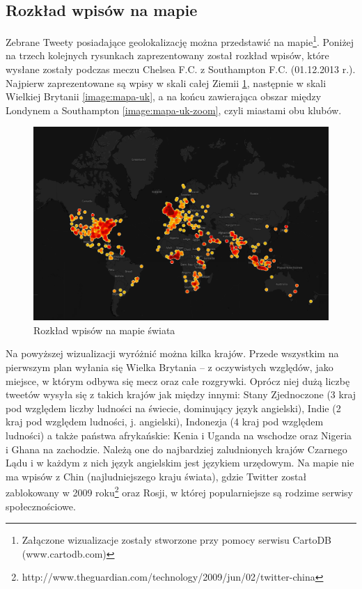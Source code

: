 

\clearpage
\subsection{Rozkład wpisów na mapie}
\label{subsection:rozkladnamapie}
Zebrane Tweety posiadające geolokalizację można przedstawić na
mapie\footnote{Załączone wizualizacje zostały stworzone przy pomocy serwisu
CartoDB (www.cartodb.com)}.
Poniżej na trzech kolejnych rysunkach zaprezentowany został rozkład wpisów,
które wysłane zostały podczas meczu Chelsea F.C. z Southampton F.C.
(01.12.2013 r.). Najpierw zaprezentowane są wpisy w skali całej Ziemii
\ref{image:mapa-swiata}, następnie w skali Wielkiej Brytanii
\ref{image:mapa-uk}, a na końcu zawierająca obszar między Londynem a Southampton
\ref{image:mapa-uk-zoom}, czyli miastami obu klubów.

\begin{figure}[ht!]
\centering
\includegraphics[width=140mm]{img/geo-chelsea-southampton.png}
\caption{Rozkład wpisów na mapie świata}
\label{image:mapa-swiata}
\end{figure}

Na powyższej wizualizacji wyróżnić można kilka krajów. Przede wszystkim na
pierwszym plan wyłania się Wielka Brytania -- z oczywistych względów, jako
miejsce, w którym odbywa się mecz oraz całe rozgrywki. Oprócz niej dużą liczbę
tweetów wysyła się z takich krajów jak między innymi:
Stany Zjednoczone (3 kraj pod względem liczby ludności na świecie, dominujący
język angielski), Indie (2 kraj pod względem ludności, j. angielski), Indonezja
(4 kraj pod względem ludności) a także państwa afrykańskie: Kenia i Uganda na
wschodze oraz Nigeria i Ghana na zachodzie. Należą one do najbardziej
zaludnionych krajów Czarnego Lądu i w każdym z nich język angielskim jest
językiem urzędowym.
Na mapie nie ma wpisów z Chin (najludniejszego kraju świata), gdzie Twitter
został zablokowany w 2009
roku\footnote{http://www.theguardian.com/technology/2009/jun/02/twitter-china}
oraz Rosji, w której popularniejsze są rodzime serwisy społecznościowe.


